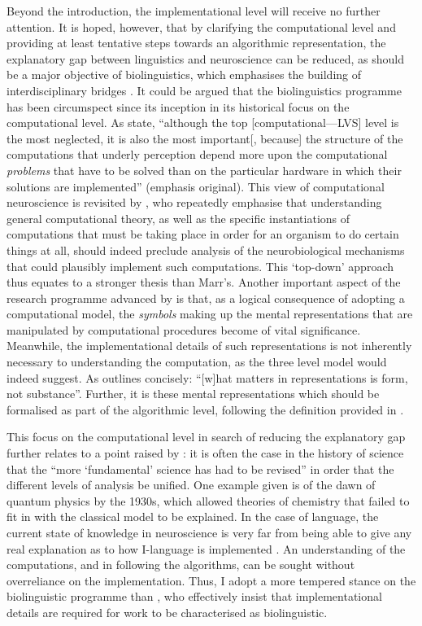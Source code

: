 Beyond the introduction, the implementational level will receive no further attention. It is hoped, however, that by clarifying the computational level and providing at least tentative steps towards an algorithmic representation, the explanatory gap between linguistics and neuroscience can be reduced, as should be a major objective of biolinguistics, which emphasises the building of interdisciplinary bridges \parencite{DiSciulloAM.BoeckxC_2011, BoeckxC_2013, WatumullJ_2013}. It could be argued that the biolinguistics programme has been circumspect since its inception in its historical focus on the computational level. As \textcite[2]{MarrD.PoggioT_1976} state, ``although the top [computational---LVS] level is the most neglected, it is also the most important[, because] the structure of the computations that underly perception depend more upon the computational \textit{problems} that have to be solved than on the particular hardware in which their solutions are implemented'' (emphasis original). This view of computational neuroscience is revisited by \textcite{GallistelCR.KingAP_2010}, who repeatedly emphasise that understanding general computational theory, as well as the specific instantiations of computations that must be taking place in order for an organism to do certain things at all, should indeed preclude analysis of the neurobiological mechanisms that could plausibly implement such computations. This `top-down' approach thus equates to a stronger thesis than Marr's. Another important aspect of the research programme advanced by \textcite{GallistelCR.KingAP_2010} is that, as a logical consequence of adopting a computational model, the \textit{symbols} making up the mental representations that are manipulated by computational procedures become of vital significance. Meanwhile, the implementational details of such representations is not inherently necessary to understanding the computation, as the three level model would indeed suggest. As \textcite{GallistelCR_2001} outlines concisely: ``[w]hat matters in representations is form, not substance''. Further, it is these mental representations which should be formalised as part of the algorithmic level, following the definition provided in .

This focus on the computational level in search of reducing the explanatory gap further relates to a point raised by \textcite[187]{ChomskyN_1994a}: it is often the case in the history of science that the ``more `fundamental' science has had to be revised'' in order that the different levels of analysis be unified. One example given is of the dawn of quantum physics by the 1930s, which allowed theories of chemistry that failed to fit in with the classical model to be explained. In the case of language, the current state of knowledge in neuroscience is very far from being able to give any real explanation as to how I-language is implemented \parencite[cf.][]{GallistelCR.KingAP_2010}. An understanding of the computations, and in following the algorithms, can be sought without overreliance on the implementation. Thus, I adopt a more tempered stance on the biolinguistic programme than \textcite{MartinsPT.BoeckxC_2016}, who effectively insist that implementational details are required for work to be characterised as biolinguistic.

